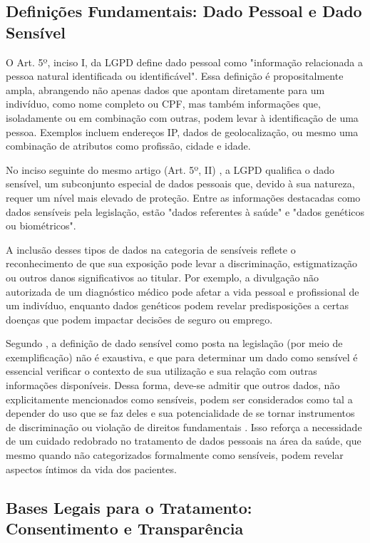 \subsection{Definições Fundamentais: Dado Pessoal e Dado Sensível}
\label{subsec:fund-dados-sensiveis}

O Art. 5º, inciso I, da LGPD \cite{Brasil2018lgpd} define dado pessoal como "informação relacionada a pessoa natural identificada ou identificável". Essa definição é propositalmente ampla, abrangendo não apenas dados que apontam diretamente para um indivíduo, como nome completo ou CPF, mas também informações que, isoladamente ou em combinação com outras, podem levar à identificação de uma pessoa. Exemplos incluem endereços IP, dados de geolocalização, ou mesmo uma combinação de atributos como profissão, cidade e idade.

No inciso seguinte do mesmo artigo (Art. 5º, II) \cite{Brasil2018lgpd}, a LGPD qualifica o dado sensível, um subconjunto especial de dados pessoais que, devido à sua natureza, requer um nível mais elevado de proteção. Entre as informações destacadas como dados sensíveis pela legislação, estão "dados referentes à saúde" e "dados genéticos ou biométricos". 

A inclusão desses tipos de dados na categoria de sensíveis reflete o reconhecimento de que sua exposição pode levar a discriminação, estigmatização ou outros danos significativos ao titular. Por exemplo, a divulgação não autorizada de um diagnóstico médico pode afetar a vida pessoal e profissional de um indivíduo, enquanto dados genéticos podem revelar predisposições a certas doenças que podem impactar decisões de seguro ou emprego.

Segundo , a definição de dado sensível como posta na legislação (por meio de exemplificação) não é exaustiva, e que para determinar um dado como sensível é essencial verificar o contexto de sua utilização e sua relação com outras informações disponíveis. Dessa forma, deve-se admitir que outros dados, não explicitamente mencionados como sensíveis, podem ser considerados como tal a depender do uso que se faz deles e sua potencialidade de se tornar instrumentos de discriminação ou violação de direitos fundamentais \cite{TefferViola2020}. Isso reforça a necessidade de um cuidado redobrado no tratamento de dados pessoais na área da saúde, que mesmo quando não categorizados formalmente como sensíveis, podem revelar aspectos íntimos da vida dos pacientes.

\subsection{Bases Legais para o Tratamento: Consentimento e Transparência}
\label{subsec:fund-consentimento}

